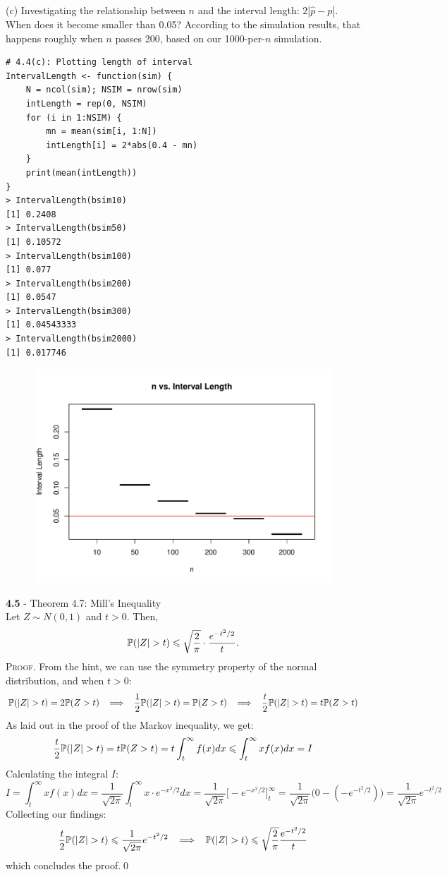 \newpage\noindent
(c) Investigating the relationship between $n$ and the interval length:
$2|\hat{p} - p|$. When does it become smaller than 0.05? According to the simulation
results, that happens roughly when $n$ passes 200, based on our 1000-per-$n$ simulation.
\begin{lstlisting}[style=RSyntax, title=R]
# 4.4(c): Plotting length of interval
IntervalLength <- function(sim) {
    N = ncol(sim); NSIM = nrow(sim)
    intLength = rep(0, NSIM)
    for (i in 1:NSIM) {
        mn = mean(sim[i, 1:N])
        intLength[i] = 2*abs(0.4 - mn) 
    } 
    print(mean(intLength))
} 
> IntervalLength(bsim10)
[1] 0.2408
> IntervalLength(bsim50)
[1] 0.10572
> IntervalLength(bsim100)
[1] 0.077
> IntervalLength(bsim200)
[1] 0.0547
> IntervalLength(bsim300)
[1] 0.04543333
> IntervalLength(bsim2000)
[1] 0.017746
\end{lstlisting}
\begin{figure}[H]
    \includegraphics[scale=0.7]{ch4_4b.pdf}
\end{figure}

\newpage\noindent
\textbf{4.5} - Theorem 4.7: Mill's Inequality\\  %
Let $Z\sim N(0,1)$ and $t>0$. Then,
$$
\P(|Z| > t) \leq \sqrt{\frac{2}{\pi}}\cdot\frac{e^{-t^2/2}}{t}.
$$
\textsc{Proof}. From the hint, we can use the symmetry property of the normal
distribution, and when $t > 0$:
$$
\P(|Z| > t) = 2\P(Z > t)
\imp
\frac{1}{2}\P(|Z| > t) = \P(Z > t)
\imp
\frac{t}{2}\P(|Z| > t) = t\P(Z > t)
$$
As laid out in the proof of the Markov inequality, we get:
$$
\frac{t}{2}\P(|Z| > t) = t\P(Z > t) = t\int_t^\infty f(x)dx \leq \int_t^\infty xf(x)dx = I
$$
Calculating the integral $I$:
$$
I = \int_t^\infty xf(x)dx =
\frac{1}{\sqrt{2\pi}}\int_t^\infty x\cdot e^{-x^2/2}dx =
\frac{1}{\sqrt{2\pi}}\big[-e^{-x^2/2}\big]_t^\infty = \frac{1}{\sqrt{2\pi}}\Big(0 - (-e^{-t^2/2})\Big)
= \frac{1}{\sqrt{2\pi}}e^{-t^2/2}
$$
Collecting our findings:
$$
\frac{t}{2}\P(|Z| > t) \leq \frac{1}{\sqrt{2\pi}}e^{-t^2/2}
\imp
\P(|Z| > t) \leq \sqrt{\frac{2}{\pi}}\frac{e^{-t^2/2}}{t}
$$
which concludes the proof.\qed

